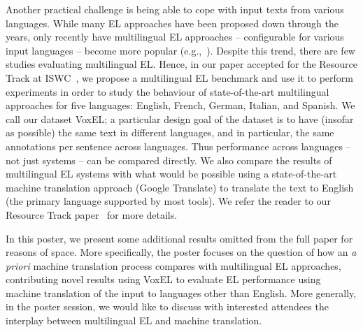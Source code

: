 \documentclass{llncs}
\begin{document}
Another practical challenge is being able to cope with input texts from various languages. While many EL approaches have been proposed down through the years, only recently have multilingual EL approaches -- configurable for various input languages -- become more popular (e.g.,~\cite{ferragina2010tagme,daiber2013improving,Babelfy-moro2014entity,freme-ner2016}). 
%
 Despite this trend, there are few studies evaluating multilingual EL. Hence, in our paper accepted for the Resource Track at ISWC~\cite{ourISWC}, we propose a multilingual EL benchmark and use it to perform experiments in order to study the behaviour of state-of-the-art multilingual approaches for five languages: English, French, German, Italian, and Spanish. We call our dataset VoxEL; a particular design goal of the dataset is to have (insofar as possible) the same text in different languages, and in particular, the same annotations per sentence across languages. Thus performance across languages -- not just systems -- can be compared directly. We also compare the results of multilingual EL systems with what would be possible using a state-of-the-art machine translation approach (Google Translate) to translate the text to English (the primary language supported by most tools). We refer the reader to our Resource Track paper~\cite{ourISWC} for more details.

In this poster, we present some additional results omitted from the full paper for reasons of space. More specifically, the poster focuses on the question of how an \textit{a priori} machine translation process compares with multilingual EL approaches, contributing novel results using VoxEL to evaluate EL performance using machine translation of the input to languages other than English. More generally, in the poster session, we would like to discuss with interested attendees the interplay between multilingual EL and machine translation.
\end{document}
